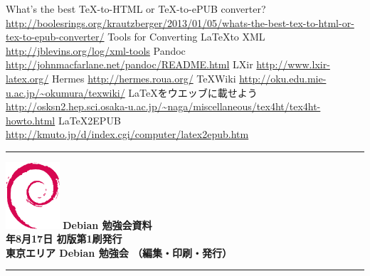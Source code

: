 \documentclass[mingoth,a4paper]{jsarticle}
\newcommand{\debmtgyear}{2013}
\newcommand{\debmtgmonth}{8}
\newcommand{\debmtgdate}{17}
\begin{document}
\begin{thebibliography}{0}
  What’s the best \TeX-to-HTML or \TeX-to-ePUB converter?
   \url{http://boolesrings.org/krautzberger/2013/01/05/whats-the-best-tex-to-html-or-tex-to-epub-converter/}
  Tools for Converting \LaTeX to XML
   \url{http://jblevins.org/log/xml-tools}
  Pandoc \url{http://johnmacfarlane.net/pandoc/README.html}
  LXir \url{http://www.lxir-latex.org/}
  Hermes \url{http://hermes.roua.org/}
  \TeX Wiki \url{http://oku.edu.mie-u.ac.jp/~okumura/texwiki/}
  \LaTeX をウエッブに載せよう
   \url{http://osksn2.hep.sci.osaka-u.ac.jp/~naga/miscellaneous/tex4ht/tex4ht-howto.html}
  \LaTeX2EPUB \url{http://kmuto.jp/d/index.cgi/computer/latex2epub.htm}
\end{thebibliography}


\cleartooddpage

\vspace*{15cm}
\hrule
\vspace{2mm}
\includegraphics[width=2cm]{image200502/openlogo-nd.eps}
\noindent \Large \bf Debian 勉強会資料\\
\noindent \normalfont \debmtgyear{}年\debmtgmonth{}月\debmtgdate{}日 \hspace{5mm}  初版第1刷発行\\
\noindent \normalfont 東京エリア Debian 勉強会 （編集・印刷・発行）\\
\hrule
\end{document}
